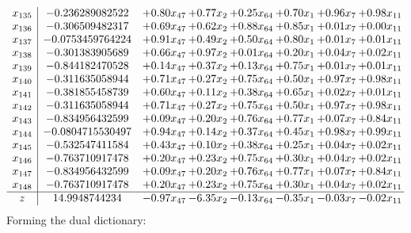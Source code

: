 \documentclass[8pt]{article}
\begin{document}
\[\begin{array}{c| c c@{\hskip 2pt} c@{\hskip 2pt} c@{\hskip 2pt} c@{\hskip 2pt} c@{\hskip 2pt} c@{\hskip 2pt} }
 x_{135}   &  -0.236289082522 & +  0.80 x_{47} & +  0.77 x_{2} & +  0.25 x_{64} & +  0.70 x_{1} & +  0.96 x_{7} & +  0.98 x_{11}\\
 x_{136}   &  -0.306509482317 & +  0.69 x_{47} & +  0.62 x_{2} & +  0.88 x_{64} & +  0.85 x_{1} & +  0.01 x_{7} & +  0.00 x_{11}\\
 x_{137}   &  -0.0753459764224 & +  0.91 x_{47} & +  0.49 x_{2} & +  0.50 x_{64} & +  0.80 x_{1} & +  0.01 x_{7} & +  0.01 x_{11}\\
 x_{138}   &  -0.301383905689 & +  0.66 x_{47} & +  0.97 x_{2} & +  0.01 x_{64} & +  0.20 x_{1} & +  0.04 x_{7} & +  0.02 x_{11}\\
 x_{139}   &  -0.844182470528 & +  0.14 x_{47} & +  0.37 x_{2} & +  0.13 x_{64} & +  0.75 x_{1} & +  0.01 x_{7} & +  0.01 x_{11}\\
 x_{140}   &  -0.311635058944 & +  0.71 x_{47} & +  0.27 x_{2} & +  0.75 x_{64} & +  0.50 x_{1} & +  0.97 x_{7} & +  0.98 x_{11}\\
 x_{141}   &  -0.381855458739 & +  0.60 x_{47} & +  0.11 x_{2} & +  0.38 x_{64} & +  0.65 x_{1} & +  0.02 x_{7} & +  0.01 x_{11}\\
 x_{142}   &  -0.311635058944 & +  0.71 x_{47} & +  0.27 x_{2} & +  0.75 x_{64} & +  0.50 x_{1} & +  0.97 x_{7} & +  0.98 x_{11}\\
 x_{143}   &  -0.834956432599 & +  0.09 x_{47} & +  0.20 x_{2} & +  0.76 x_{64} & +  0.77 x_{1} & +  0.07 x_{7} & +  0.84 x_{11}\\
 x_{144}   &  -0.0804715530497 & +  0.94 x_{47} & +  0.14 x_{2} & +  0.37 x_{64} & +  0.45 x_{1} & +  0.98 x_{7} & +  0.99 x_{11}\\
 x_{145}   &  -0.532547411584 & +  0.43 x_{47} & +  0.10 x_{2} & +  0.38 x_{64} & +  0.25 x_{1} & +  0.04 x_{7} & +  0.02 x_{11}\\
 x_{146}   &  -0.763710917478 & +  0.20 x_{47} & +  0.23 x_{2} & +  0.75 x_{64} & +  0.30 x_{1} & +  0.04 x_{7} & +  0.02 x_{11}\\
 x_{147}   &  -0.834956432599 & +  0.09 x_{47} & +  0.20 x_{2} & +  0.76 x_{64} & +  0.77 x_{1} & +  0.07 x_{7} & +  0.84 x_{11}\\
 x_{148}   &  -0.763710917478 & +  0.20 x_{47} & +  0.23 x_{2} & +  0.75 x_{64} & +  0.30 x_{1} & +  0.04 x_{7} & +  0.02 x_{11}\\
\hline
z    &  14.9948744234 & -0.97 x_{47} & -6.35 x_{2} & -0.13 x_{64} & -0.35 x_{1} & -0.03 x_{7} & -0.02 x_{11}\\
\end{array}\]
Forming the dual dictionary:
\end{document}
